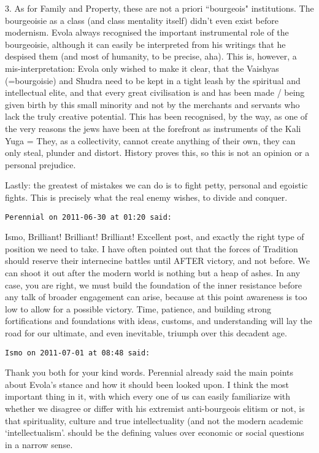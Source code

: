 \begin{footnotesize}
\begin{sffamily}
3. As for Family and Property, these are not a priori ``bourgeois" institutions. The bourgeoisie as a class (and class mentality itself) didn't even exist before modernism. Evola always recognised the important instrumental role of the bourgeoisie, although it can easily be interpreted from his writings that he despised them (and most of humanity, to be precise, aha). This is, however, a mis-interpretation: Evola only wished to make it clear, that the Vaishyas (=bourgoisie) and Shudra need to be kept in a tight leash by the spiritual and intellectual elite, and that every great civilisation is and has been made / being given birth by this small minority and not by the merchants and servants who lack the truly creative potential. This has been recognised, by the way, as one of the very reasons the jews have been at the forefront as instruments of the Kali Yuga = They, as a collectivity, cannot create anything of their own, they can only steal, plunder and distort. History proves this, so this is not an opinion or a personal prejudice.

Lastly: the greatest of mistakes we can do is to fight petty, personal and egoistic fights. This is precisely what the real enemy wishes, to divide and conquer.


\hfill

\texttt{Perennial on 2011-06-30 at 01:20 said: }

Ismo, Brilliant! Brilliant! Brilliant! Excellent post, and exactly the right type of position we need to take. I have often pointed out that the forces of Tradition should reserve their internecine battles until AFTER victory, and not before. We can shoot it out after the modern world is nothing but a heap of ashes. In any case, you are right, we must build the foundation of the inner resistance before any talk of broader engagement can arise, because at this point awareness is too low to allow for a possible victory. Time, patience, and building strong fortifications and foundations with ideas, customs, and understanding will lay the road for our ultimate, and even inevitable, triumph over this decadent age.


\hfill

\texttt{Ismo on 2011-07-01 at 08:48 said: }

Thank you both for your kind words. Perennial already said the main points about Evola's stance and how it should been looked upon. I think the most important thing in it, with which every one of us can easily familiarize with whether we disagree or differ with his extremist anti-bourgeois elitism or not, is that spirituality, culture and true intellectuality (and not the modern academic `intellectualism'. should be the defining values over economic or social questions in a narrow sense.



\end{sffamily}
\end{footnotesize}

